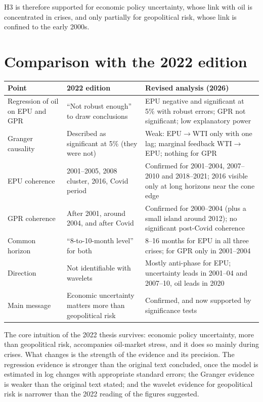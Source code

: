 \documentclass[11pt,a4paper]{article}
\begin{document}
H3 is therefore supported for economic policy uncertainty, whose link with oil
is concentrated in crises, and only partially for geopolitical risk, whose link
is confined to the early 2000s.

\section{Comparison with the 2022 edition}\label{sec:compare}

\begin{small}
\begin{tabular}{@{}L{0.24\textwidth}L{0.33\textwidth}L{0.37\textwidth}@{}}
\toprule
Point & 2022 edition & Revised analysis (2026) \\
\midrule
Regression of oil on EPU and GPR & ``Not robust enough'' to draw conclusions &
EPU negative and significant at 5\% with robust errors; GPR not significant;
low explanatory power \\[2pt]
Granger causality & Described as significant at 5\% (they were not) &
Weak: EPU$\to$WTI only with one lag; marginal feedback WTI$\to$EPU; nothing for GPR \\[2pt]
EPU coherence & 2001--2005, 2008 cluster, 2016, Covid period &
Confirmed for 2001--2004, 2007--2010 and 2018--2021; 2016 visible only at long
horizons near the cone edge \\[2pt]
GPR coherence & After 2001, around 2004, and after Covid &
Confirmed for 2000--2004 (plus a small island around 2012); no significant post-Covid coherence \\[2pt]
Common horizon & ``8-to-10-month level'' for both &
8--16 months for EPU in all three crises; for GPR only in 2001--2004 \\[2pt]
Direction & Not identifiable with wavelets &
Mostly anti-phase for EPU; uncertainty leads in 2001--04 and 2007--10, oil leads in 2020 \\[2pt]
Main message & Economic uncertainty matters more than geopolitical risk &
Confirmed, and now supported by significance tests \\
\bottomrule
\end{tabular}
\end{small}

\medskip
The core intuition of the 2022 thesis survives: economic policy uncertainty, more
than geopolitical risk, accompanies oil-market stress, and it does so mainly
during crises. What changes is the strength of the evidence and its precision.
The regression evidence is stronger than the original text concluded, once the
model is estimated in log changes with appropriate standard errors; the Granger
evidence is weaker than the original text stated; and the wavelet evidence for
geopolitical risk is narrower than the 2022 reading of the figures suggested.
\end{document}

